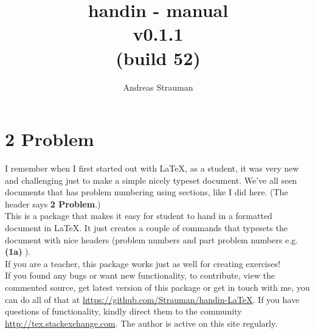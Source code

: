 \documentclass[a4paper]{article}
\title{{handin - manual\\ v0.1.1{\\[-0.5em]\footnotesize(build 52)}}}
\author{Andreas Strauman}
\let\oldTOC\tableofcontents
\renewcommand\tableofcontents{\hypersetup{linkcolor=black}\oldTOC\hypersetup{linkcolor=Definition}}
\let\oldsection\section
\gdef\section{\needspace{0.3\paperheight}\oldsection}
\begin{document}
\maketitle
\section*{2 Problem}
I remember when I first started out with LaTeX, as a student, it was very new and challenging just to make a simple nicely typeset document. We've all seen documents that has problem numbering using sections, like I did here. (The header says \textbf{2 Problem}.)\\

This is a package that makes it easy for student to hand in a formatted document in LaTeX. It just creates a couple of commands that typesets the document with nice headers (problem numbers and part problem numbers e.g. \textbf{(1a)} ).\\

If you are a teacher, this package works just as well for creating exercises!\\
 
If you found any bugs or want new functionality, to contribute, view the commented source, get latest version of this package or get in touch with me, you can do all of that at \url{https://github.com/Strauman/handin-LaTeX}. If you have questions of functionality, kindly direct them to the community\\ \url{http://tex.stackexchange.com}. The author is active on this site regularly.

\tableofcontents
\clearpage
\end{document}
